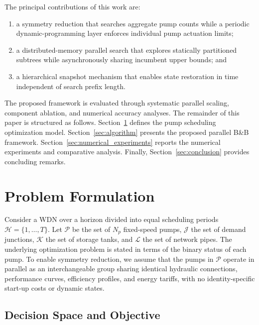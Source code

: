 \documentclass[Journal,letterpaper,InsideFigs]{ascelike-new}
\begin{document}
The principal contributions of this work are:

\begin{enumerate}
	\item a symmetry reduction that searches aggregate pump counts while a periodic dynamic-programming layer enforces individual pump actuation limits;
	\item a distributed-memory parallel search that explores statically partitioned subtrees while asynchronously sharing incumbent upper bounds; and
	\item a hierarchical snapshot mechanism that enables state restoration in time independent of search prefix length.
\end{enumerate}

The proposed framework is evaluated through systematic parallel scaling, component ablation, and numerical accuracy analyses. The remainder of this paper is structured as follows. Section~\ref{sec:problem_formulation} defines the pump scheduling optimization model. Section~\ref{sec:algorithm} presents the proposed parallel B\&B framework. Section~\ref{sec:numerical_experiments} reports the numerical experiments and comparative analysis. Finally, Section~\ref{sec:conclusion} provides concluding remarks.

\section{Problem Formulation}
\label{sec:problem_formulation}

Consider a WDN over a horizon divided into equal scheduling periods $\mathcal{H}=\{1,\ldots,T\}$. Let $\mathcal{P}$ be the set of $N_p$ fixed-speed pumps, $\mathcal{J}$ the set of demand junctions, $\mathcal{K}$ the set of storage tanks, and $\mathcal{L}$ the set of network pipes. The underlying optimization problem is stated in terms of the binary status of each pump.  To enable symmetry reduction, we assume that the pumps in $\mathcal{P}$ operate in parallel as an interchangeable group sharing identical hydraulic connections, performance curves, efficiency profiles, and energy tariffs, with no identity-specific start-up costs or dynamic states.

\subsection{Decision Space and Objective}
\end{document}
